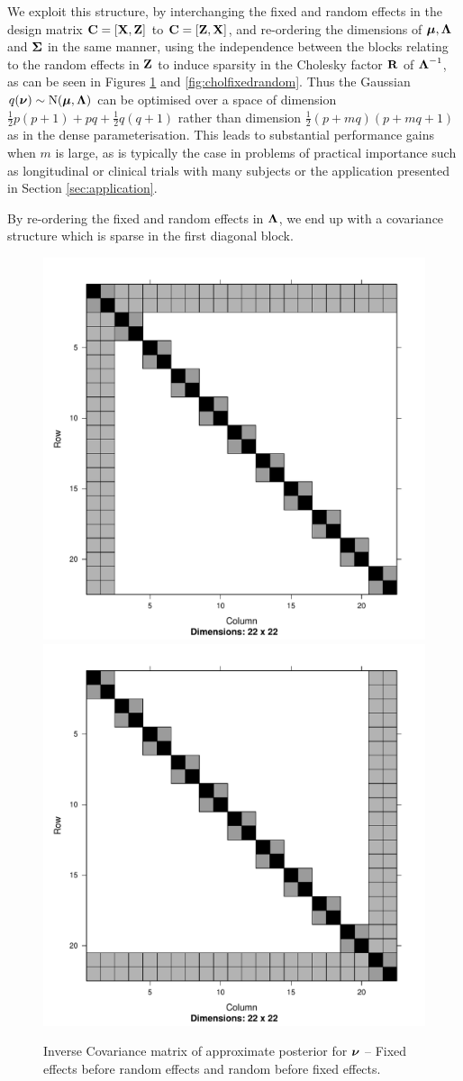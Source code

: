 \noindent We exploit this structure, by interchanging the fixed and random
effects in the design matrix ${\bf C} = [{\bf X}, {\bf Z}]$ to ${\bf C} = [{\bf Z}, {\bf X}]$, and
re-ordering the dimensions of ${\boldsymbol \mu}, {\boldsymbol \Lambda}$ and ${\boldsymbol \Sigma}$ in the same
manner, using the independence between the blocks relating to the random
effects in ${\bf Z}$ to induce sparsity in the Cholesky factor ${\bf R}$ of
${\boldsymbol \Lambda}^{-1}$, as can be seen in Figures \ref{fig:covfixedrandom} and
\ref{fig:cholfixedrandom}. Thus the Gaussian $q({\boldsymbol \nu}) \sim \text{N}({\boldsymbol \mu}, {\boldsymbol \Lambda})$
can be optimised over a space of dimension $\tfrac{1}{2} p (p + 1) + pq +
\tfrac{1}{2} q (q + 1)$ rather than dimension $\tfrac{1}{2} (p + mq) (p + mq +
1)$ as in the dense parameterisation.  This leads to substantial performance
gains when $m$ is large, as is typically the case in problems of practical
importance such as longitudinal or clinical trials with many subjects or the
application presented in Section \ref{sec:application}.
		
By re-ordering the fixed and random effects in ${\boldsymbol \Lambda}$, we end up with a
covariance structure which is sparse in the first diagonal block.

\begin{figure}[h!]
	\includegraphics[width=0.35 \textwidth]{mX_mZ_mLambda.pdf}
	\includegraphics[width=0.35 \textwidth]{mZ_mX_mLambda.pdf}
	\caption{Inverse Covariance matrix of approximate posterior for ${\boldsymbol \nu}$ -- Fixed effects before random effects
						and random before fixed effects.}
	\label{fig:covfixedrandom}
\end{figure}
	
